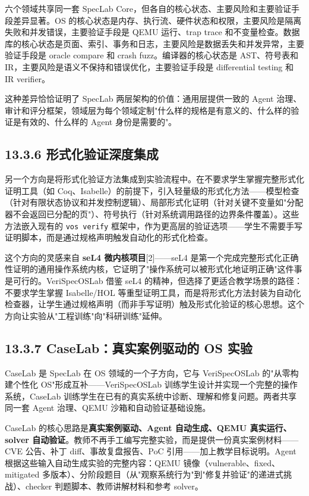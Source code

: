 \documentclass[UTF8,a4paper,12pt,openany]{ctexrep}
\newcommand{\passthrough}[1]{#1}
\begin{document}
六个领域共享同一套 SpecLab Core，但各自的核心状态、主要风险和主要验证手段差异显著。OS 的核心状态是内存、执行流、硬件状态和权限，主要风险是隔离失败和并发错误，主要验证手段是 QEMU 运行、trap trace 和不变量检查。数据库的核心状态是页面、索引、事务和日志，主要风险是数据丢失和并发异常，主要验证手段是 oracle compare 和 crash fuzz。编译器的核心状态是 AST、符号表和 IR，主要风险是语义不保持和错误优化，主要验证手段是 differential testing 和 IR verifier。

这种差异恰恰证明了 SpecLab 两层架构的价值：通用层提供一致的 Agent 治理、审计和评分框架，领域层为每个领域定制"什么样的规格是有意义的、什么样的验证是有效的、什么样的 Agent 身份是需要的"。

\subsection{13.3.6 形式化验证深度集成}\label{1336-ux5f62ux5f0fux5316ux9a8cux8bc1ux6df1ux5ea6ux96c6ux6210}

另一个方向是将形式化验证方法集成到实验流程中。在不要求学生掌握完整形式化证明工具（如 Coq、Isabelle）的前提下，引入轻量级的形式化方法------模型检查（针对有限状态协议和并发控制逻辑）、局部形式化证明（针对关键不变量如"分配器不会返回已分配的页"）、符号执行（针对系统调用路径的边界条件覆盖）。这些方法嵌入现有的 \passthrough{\lstinline!vos verify!} 框架中，作为更高层的验证选项------学生不需要手写证明脚本，而是通过规格声明触发自动化的形式化检查。

这个方向的灵感来自 \textbf{seL4 微内核项目}{[}2{]}------seL4 是第一个完成完整形式化正确性证明的通用操作系统内核，它证明了"操作系统可以被形式化地证明正确"这件事是可行的。VeriSpecOSLab 借鉴 seL4 的精神，但选择了更适合教学场景的路径：不要求学生掌握 Isabelle/HOL 等重型证明工具，而是将形式化方法封装为自动化检查器，让学生通过规格声明（而非手写证明）触及形式化验证的核心思想。这个方向让实验从"工程训练"向"科研训练"延伸。

\subsection{13.3.7 CaseLab：真实案例驱动的 OS 实验}\label{1337-caselabux771fux5b9eux6848ux4f8bux9a71ux52a8ux7684-os-ux5b9eux9a8c}

CaseLab 是 SpecLab 在 OS 领域的一个子方向，它与 VeriSpecOSLab 的"从零构建个性化 OS"形成互补------VeriSpecOSLab 训练学生设计并实现一个完整的操作系统，CaseLab 训练学生在已有的真实系统中诊断、理解和修复问题。两者共享同一套 Agent 治理、QEMU 沙箱和自动验证基础设施。

CaseLab 的核心思路是\textbf{真实案例驱动、Agent 自动生成、QEMU 真实运行、solver 自动验证}。教师不再手工编写完整实验，而是提供一份真实案例材料------CVE 公告、补丁 diff、事故复盘报告、PoC 引用------加上教学目标说明。Agent 根据这些输入自动生成实验的完整内容：QEMU 镜像（vulnerable、fixed、mitigated 多版本）、分阶段题目（从"观察系统行为"到"修复并验证"的递进式挑战）、checker 判题脚本、教师讲解材料和参考 solver。
\end{document}
